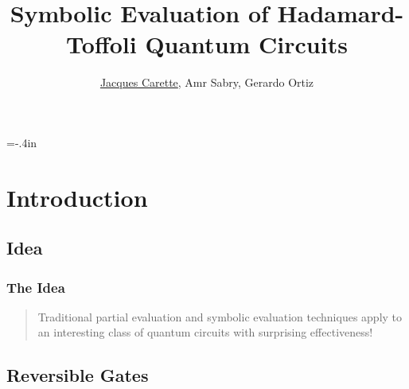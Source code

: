 \documentclass{beamer}
\title[\pgfuseimage{logo}] %
{Symbolic Evaluation of Hadamard-Toffoli Quantum Circuits}
\author[]{\underline{Jacques Carette}, Amr Sabry, Gerardo Ortiz}
\begin{document}
\hoffset=-.4in %
\begin{frame}[plain]

\titlepage

\end{frame}
\hoffset=0in %


\section[Introduction]{Introduction}

\subsection[Result]{Idea}

\begin{frame}
  \frametitle{The Idea}

  \begin{quote}
Traditional partial evaluation and symbolic evaluation techniques
apply to an interesting class of quantum circuits with surprising effectiveness!
    \end{quote}

  \end{frame}

\subsection[Reversible]{Reversible Gates}
\end{document}
